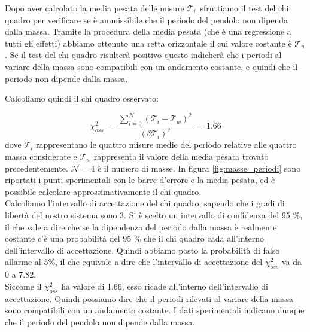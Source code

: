 \label{m_chi_pesata}

Dopo aver calcolato la media pesata delle misure $\mathcal{T}_i\,$ sfruttiamo il test del chi quadro per verificare se
è ammissibile che il periodo del pendolo non dipenda dalla massa. Tramite la procedura della media pesata (che è una regressione
a tutti gli effetti) abbiamo ottenuto
una retta orizzontale il cui valore costante è $\mathcal{T}_w$. Se il test del chi quadro risulterà positivo questo indicherà
che i periodi al variare della massa sono compatibili con un andamento costante, e quindi che il periodo non dipende dalla massa.


%
Calcoliamo quindi il chi quadro osservato:

\begin{equation*}
	\chi_{oss}^2 \,=\, \frac{\sum_{i=0}^{\mathcal{N}} (\mathcal{T}_i - \mathcal{T}_w)^2}{(\delta \mathcal{T}_i)^2} \,=\, 1.66
\end{equation*}
%
dove $\mathcal{T}_i$ rappresentano le quattro misure medie del periodo relative alle quattro massa considerate e $\mathcal{T}_w$ rappresenta il valore della media pesata trovato precedentemente. $\mathcal{N} = 4$ è il numero di masse. In figura \ref{fig:masse_periodi} sono
riportati i punti sperimentali con le barre d'errore e la media pesata, ed è possibile calcolare approssimativamente il chi quadro. \\

Calcoliamo l'intervallo di accettazione del chi quadro, sapendo che i gradi di libertà del nostro sistema sono 3.
Si è scelto un intervallo di confidenza del 95 \%, il che vale a dire che se la dipendenza del periodo dalla massa è realmente costante
c'è una probabilità del 95 \% che il chi quadro cada all'interno dell'intervallo di accettazione.
Quindi abbiamo posto la probabilità di falso allarme al $5\%$, il che equivale a dire che l'intervallo di accettazione del $\chi_{oss}^2$ va da 0 a 7.82.\\
Siccome il $\chi_{oss}^2$ ha valore di 1.66, esso ricade all'interno dell'intervallo di accettazione.
Quindi possiamo dire che il periodi rilevati
al variare della massa sono compatibili con un andamento costante. I dati sperimentali indicano dunque che
il periodo del pendolo non dipende dalla massa. 

